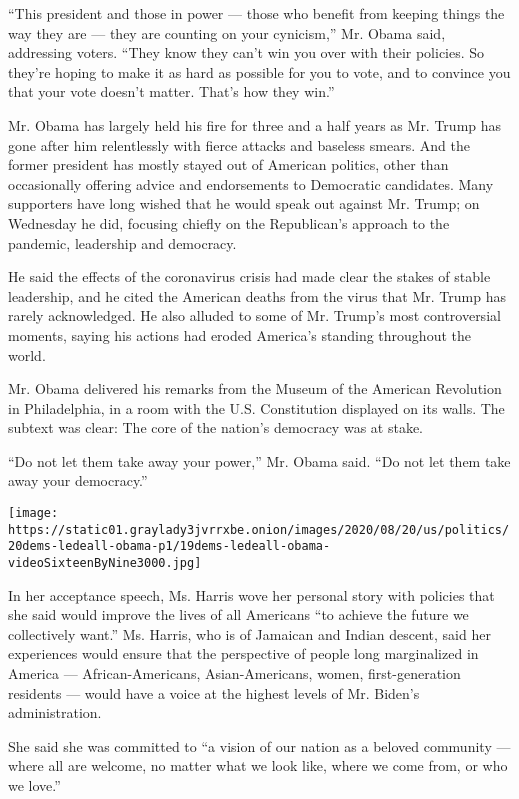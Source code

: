 ``This president and those in power --- those who benefit from keeping
things the way they are --- they are counting on your cynicism,'' Mr.
Obama said, addressing voters. ``They know they can't win you over with
their policies. So they're hoping to make it as hard as possible for you
to vote, and to convince you that your vote doesn't matter. That's how
they win.''

Mr. Obama has largely held his fire for three and a half years as Mr.
Trump has gone after him relentlessly with fierce attacks and baseless
smears. And the former president has mostly stayed out of American
politics, other than occasionally offering advice and endorsements to
Democratic candidates. Many supporters have long wished that he would
speak out against Mr. Trump; on Wednesday he did, focusing chiefly on
the Republican's approach to the pandemic, leadership and democracy.

He said the effects of the coronavirus crisis had made clear the stakes
of stable leadership, and he cited the American deaths from the virus
that Mr. Trump has rarely acknowledged. He also alluded to some of Mr.
Trump's most controversial moments, saying his actions had eroded
America's standing throughout the world.

Mr. Obama delivered his remarks from the Museum of the American
Revolution in Philadelphia, in a room with the U.S. Constitution
displayed on its walls. The subtext was clear: The core of the nation's
democracy was at stake.

``Do not let them take away your power,'' Mr. Obama said. ``Do not let
them take away your democracy.''

\texttt{[image: https://static01.graylady3jvrrxbe.onion/images/2020/08/20/us/politics/20dems-ledeall-obama-p1/19dems-ledeall-obama-videoSixteenByNine3000.jpg]}

In her acceptance speech, Ms. Harris wove her personal story with
policies that she said would improve the lives of all Americans ``to
achieve the future we collectively want.'' Ms. Harris, who is of
Jamaican and Indian descent, said her experiences would ensure that the
perspective of people long marginalized in America ---
African-Americans, Asian-Americans, women, first-generation residents
--- would have a voice at the highest levels of Mr. Biden's
administration.

She said she was committed to ``a vision of our nation as a beloved
community --- where all are welcome, no matter what we look like, where
we come from, or who we love.''

